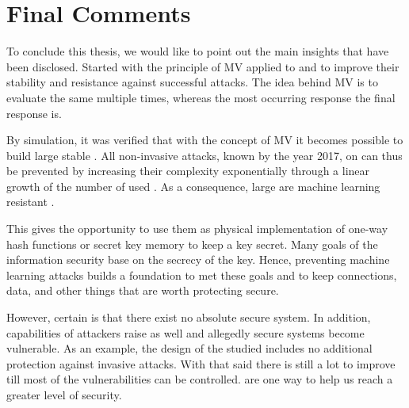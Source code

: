 
\section{Final Comments}

To conclude this thesis, we would like to point out the main insights that have been disclosed.
Started with the principle of \ac{MV} applied to \apufs and \xpufs to improve their stability and resistance against successful attacks.
The idea behind \ac{MV} is to evaluate the same \puf multiple times, whereas the most occurring response the final response is.

By simulation, it was verified that with the concept of \ac{MV} it becomes possible to build large stable \mxpufs.
All non-invasive attacks, known by the year 2017, on \xpufs can thus be prevented by increasing their complexity exponentially through a linear growth of the number of used \mpufs.
As a consequence, large \mxpufs are machine learning resistant \pufs.

This gives the opportunity to use them as physical implementation of one-way hash functions or secret key memory to keep a key secret.
Many goals of the information security base on the secrecy of the key.
Hence, preventing machine learning attacks builds a foundation to met these goals and to keep connections, data, and other things that are worth protecting secure.

However, certain is that there exist no absolute secure system.
In addition, capabilities of attackers raise as well and allegedly secure systems become vulnerable.
As an example, the design of the studied \apuf includes no additional protection against invasive attacks.
With that said there is still a lot to improve till most of the vulnerabilities can be controlled.
\pufs are one way to help us reach a greater level of security.

